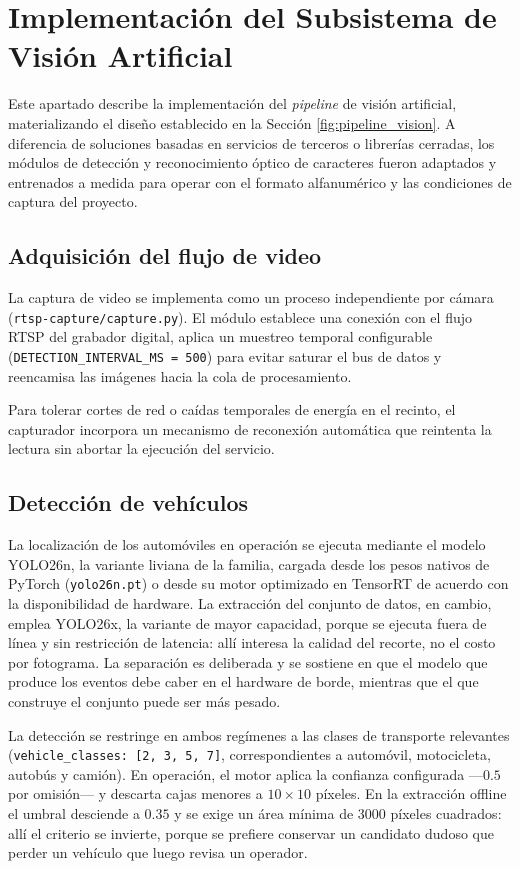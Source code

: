 \section{Implementación del Subsistema de Visión Artificial}

Este apartado describe la implementación del \textit{pipeline} de visión artificial,
materializando el diseño establecido en la Sección \ref{fig:pipeline_vision}. A
diferencia de soluciones basadas en servicios de terceros o librerías cerradas, los
módulos de detección y reconocimiento óptico de caracteres fueron adaptados y
entrenados a medida para operar con el formato alfanumérico y las condiciones de
captura del proyecto.

\subsection{Adquisición del flujo de video}

La captura de video se implementa como un proceso independiente por cámara
(\texttt{rtsp-capture/capture.py}). El módulo establece una conexión con el flujo
RTSP del grabador digital, aplica un muestreo temporal configurable
(\texttt{DETECTION\_INTERVAL\_MS = 500}) para evitar saturar el bus de datos y
reencamisa las imágenes hacia la cola de procesamiento.

Para tolerar cortes de red o caídas temporales de energía en el recinto, el
capturador incorpora un mecanismo de reconexión automática que reintenta la lectura
sin abortar la ejecución del servicio.

\subsection{Detección de vehículos}

La localización de los automóviles en operación se ejecuta mediante el modelo
YOLO26n, la variante liviana de la familia, cargada desde los pesos nativos de
PyTorch (\texttt{yolo26n.pt}) o desde su motor optimizado en TensorRT de acuerdo
con la disponibilidad de hardware. La extracción del conjunto de datos, en cambio,
emplea YOLO26x, la variante de mayor capacidad, porque se ejecuta fuera de línea y
sin restricción de latencia: allí interesa la calidad del recorte, no el costo por
fotograma. La separación es deliberada y se sostiene en que el modelo que produce
los eventos debe caber en el hardware de borde, mientras que el que construye el
conjunto puede ser más pesado.

La detección se restringe en ambos regímenes a las clases de transporte
relevantes (\texttt{vehicle\_classes: [2, 3, 5, 7]}, correspondientes a automóvil,
motocicleta, autobús y camión). En operación, el motor aplica la confianza
configurada ---$0{.}5$ por omisión--- y descarta cajas menores a $10 \times 10$
píxeles. En la extracción offline el umbral desciende a $0{.}35$ y se exige un
área mínima de $3000$ píxeles cuadrados: allí el criterio se invierte, porque se
prefiere conservar un candidato dudoso que perder un vehículo que luego revisa un
operador.

